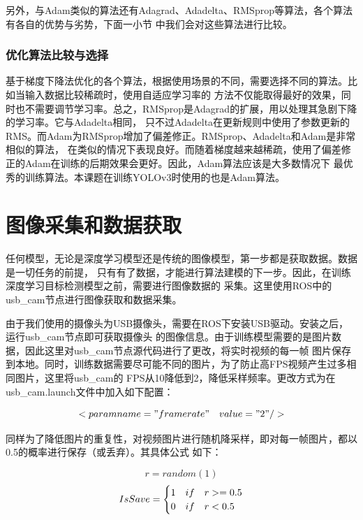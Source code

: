 另外，与Adam类似的算法还有Adagrad\cite{Adagrad}、Adadelta\cite{adadelta}、RMSprop\cite{RMSprop}等算法，各个算法有各自的优势与劣势，下面一小节
中我们会对这些算法进行比较。

\subsubsection{优化算法比较与选择}
基于梯度下降法优化的各个算法，根据使用场景的不同，需要选择不同的算法。比如当输入数据比较稀疏时，使用自适应学习率的
方法不仅能取得最好的效果，同时也不需要调节学习率。总之，RMSprop是Adagrad的扩展，用以处理其急剧下降的学习率。它与Adadelta相同，
只不过Adadelta在更新规则中使用了参数更新的RMS。而Adam为RMSprop增加了偏差修正。RMSprop、Adadelta和Adam是非常相似的算法，
在类似的情况下表现良好。而随着梯度越来越稀疏，使用了偏差修正的Adam在训练的后期效果会更好。因此，Adam算法应该是大多数情况下
最优秀的训练算法。本课题在训练YOLOv3时使用的也是Adam算法。

\section{图像采集和数据获取}

任何模型，无论是深度学习模型还是传统的图像模型，第一步都是获取数据。数据是一切任务的前提，
只有有了数据，才能进行算法建模的下一步。因此，在训练深度学习目标检测模型之前，需要进行图像数据的
采集。这里使用ROS中的usb\_cam节点进行图像获取和数据采集。

由于我们使用的摄像头为USB摄像头，需要在ROS下安装USB驱动。安装之后，运行usb\_cam节点即可获取摄像头
的图像信息。由于训练模型需要的是图片数据，因此这里对usb\_cam节点源代码进行了更改，将实时视频的每一帧
图片保存到本地。同时，训练数据需要尽可能不同的图片，为了防止高FPS视频产生过多相同图片，这里将usb\_cam的
FPS从10降低到2，降低采样频率。更改方式为在usb\_cam.launch文件中加入如下配置：

$$ <param name="framerate" \quad value="2" />$$

同样为了降低图片的重复性，对视频图片进行随机降采样，即对每一帧图片，都以0.5的概率进行保存（或丢弃）。其具体公式
如下：

$$r = random(1)$$
\begin{equation}
    \centering
    IsSave =
        \begin{cases}
            1 & if \quad r >= 0.5\\
            0 & if \quad r < 0.5
        \end{cases}
\end{equation}

